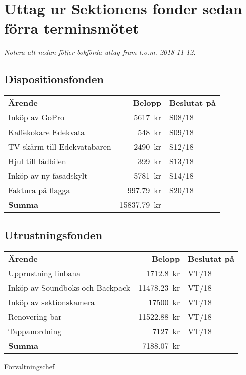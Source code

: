\documentclass[../_main/handlingar.tex]{subfiles}
\begin{document}
\section{Uttag ur Sektionens fonder sedan förra terminsmötet}
\emph{Notera att nedan följer bokförda uttag fram t.o.m. 2018-11-12.}

\subsection*{Dispositionsfonden}
\begin{tabular}{l r l}
    \textbf{Ärende} & \textbf{Belopp} & \textbf{Beslutat på} \\
    Inköp av GoPro & \SI{5617}{kr} & S08/18 \\
    Kaffekokare Edekvata & \SI{548}{kr} & S09/18 \\
    TV-skärm till Edekvatabaren & \SI{2490}{kr} & S12/18 \\
    Hjul till lådbilen & \SI{399}{kr} & S13/18 \\
    Inköp av ny fasadskylt & \SI{5781}{kr} & S14/18 \\
    Faktura på flagga & \SI{997,79}{kr} & S20/18 \\
    \hline
    \textbf{Summa} & \SI{15 837,79}{kr} \\
\end{tabular}

\subsection*{Utrustningsfonden}
\begin{tabular}{l r l}
    \textbf{Ärende} & \textbf{Belopp} & \textbf{Beslutat på} \\
    Upprustning linbana & \SI{1712,8}{kr} & VT/18 \\
    Inköp av Soundboks och Backpack & \SI{11478,23}{kr} & VT/18 \\
    Inköp av sektionskamera & \SI{17500}{kr} & VT/18 \\
    Renovering bar & \SI{11522,88}{kr} & VT/18 \\
    Tappanordning & \SI{7127}{kr} & VT/18 \\
    \hline
    \textbf{Summa} & \SI{7188,07}{kr} \\
\end{tabular}

\begin{signatures}{1}
    \ist
    \signature{Magnus Lundh}{Förvaltningschef}
\end{signatures}
\end{document}
